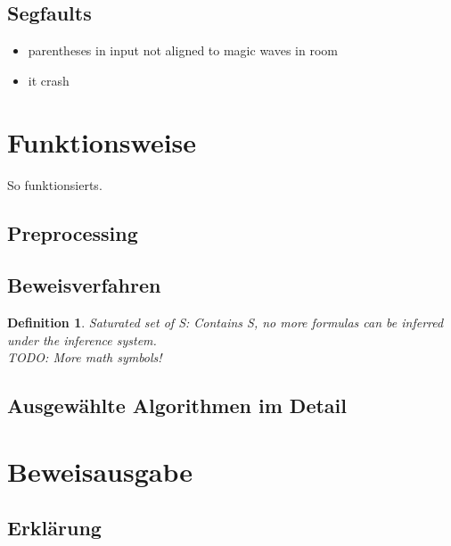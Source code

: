 \documentclass{acm_proc_article-sp-german}
\newtheorem{satset}{Definition}
\begin{document}
\subsection{Segfaults}
\label{subsec:segfaults}

\begin{itemize}
\item parentheses in input not aligned to magic waves in room
\item it crash
\end{itemize}



\section{Funktionsweise}
\label{sec:mechanics}
So funktionsierts.

\subsection{Preprocessing}
\label{subsec:preprocessing}

\subsection{Beweisverfahren}
\label{subsec:proofmech}

\begin{satset}
	Saturated set of S: Contains S, no more formulas can be inferred under the inference system.\\
	TODO: More math symbols!
\end{satset}

\subsection{Ausgewählte Algorithmen im Detail}
\label{subsec:algos}


\section{Beweisausgabe}
\label{sec:output}


\subsection{Erklärung}
\label{subsec:outputexplained}
\end{document}
